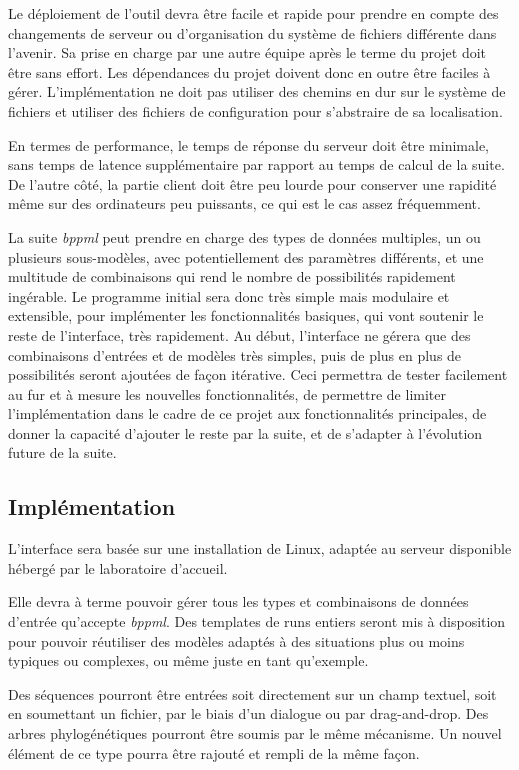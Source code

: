 Le déploiement de l'outil devra être facile et rapide
pour prendre en compte des changements de serveur
ou d'organisation du système de fichiers différente dans l'avenir.
Sa prise en charge par une autre équipe après le terme du projet
doit être sans effort.
Les dépendances du projet doivent donc en outre
être faciles à gérer.
L'implémentation ne doit pas utiliser des chemins en dur sur le système de fichiers
et utiliser des fichiers de configuration
pour s'abstraire de sa localisation.

En termes de performance,
le temps de réponse du serveur doit être minimale,
sans temps de latence supplémentaire par rapport au temps de calcul de la suite.
De l'autre côté, la partie client doit être peu lourde
pour conserver une rapidité même sur des ordinateurs peu puissants,
ce qui est le cas assez fréquemment.

La suite \textit{bppml} peut prendre en charge
des types de données multiples, un ou plusieurs sous-modèles,
avec potentiellement des paramètres différents,
et une multitude de combinaisons
qui rend le nombre de possibilités rapidement ingérable.
Le programme initial sera donc très simple mais modulaire et extensible,
pour implémenter les fonctionnalités basiques,
qui vont soutenir le reste de l'interface,
très rapidement.
Au début, l'interface ne gérera que
des combinaisons d'entrées et de modèles très simples,
puis de plus en plus de possibilités seront ajoutées de façon itérative.
Ceci permettra
de tester facilement au fur et à mesure les nouvelles fonctionnalités,
de permettre de limiter l'implémentation dans le cadre de ce projet
aux fonctionnalités principales,
de donner la capacité d'ajouter le reste par la suite,
et de s'adapter à l'évolution future de la suite.


\subsection{Implémentation}

L'interface sera basée sur une installation de Linux,
adaptée au serveur disponible hébergé par le laboratoire d'accueil.

Elle devra à terme pouvoir gérer tous les types
et combinaisons de données d'entrée qu'accepte \textit{bppml}.
Des templates de runs entiers seront mis à disposition
pour pouvoir réutiliser des modèles adaptés à des situations
plus ou moins typiques ou complexes,
ou même juste en tant qu'exemple.

Des séquences pourront être entrées soit directement sur un champ textuel,
soit en soumettant un fichier,
par le biais d'un dialogue ou par drag-and-drop.
Des arbres phylogénétiques pourront être soumis par le même mécanisme.
Un nouvel élément de ce type pourra être rajouté et rempli de la même façon.

